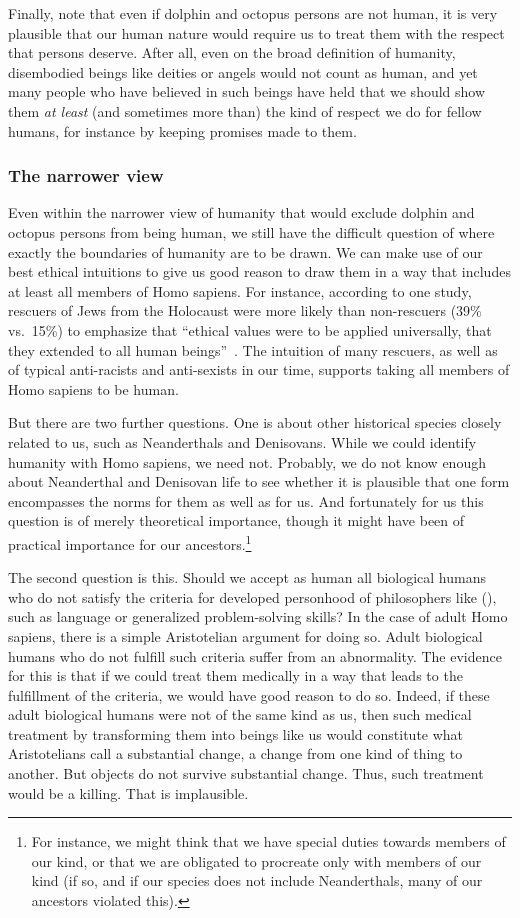 Finally, note that even if dolphin and octopus persons are not human, it is very plausible that our human nature would require us to treat them with the
respect that persons deserve. After all, even on the broad definition of humanity, disembodied beings like deities or angels would not count as human, and yet
many people who have believed in such beings have held that we should show them \textit{at least} (and sometimes more than) the 
kind of respect we do for fellow humans, for instance by keeping promises made to them.

\subsubsection{The narrower view}
Even within the narrower view of humanity that would exclude dolphin and octopus persons from being human, we still have the difficult question of where exactly the boundaries of humanity are to be drawn. 
We can make use of our best ethical intuitions to give us good reason to draw them in a way that includes at least all 
members of Homo sapiens. For instance, according to one study, rescuers of Jews from the Holocaust were more likely than non-rescuers (39\% vs.\ 15\%)
to emphasize that ``ethical values were to be applied universally, that they extended to all human beings''~\parencite[p.~165]{Oliner1988}. The intuition of many rescuers, as well as of typical anti-racists and 
anti-sexists in our time, supports taking all members of Homo sapiens to be human. 

But there are two further questions. One is about other historical species closely related to us, such as Neanderthals and Denisovans. While we could
identify humanity with Homo sapiens, we need not. Probably, we do not know enough about Neanderthal and Denisovan life to see whether it is 
plausible that one form encompasses the norms for them as well as for us. And fortunately for us this question is of merely theoretical importance, 
though it might have been of practical importance for our ancestors.\footnote{For instance, we might think that we have
special duties towards members of our kind, or that we are obligated to procreate only with members of our kind (if so, and if 
our species does not include Neanderthals, many of our ancestors violated this).}

The second question is this. Should we accept as human all biological humans who do not satisfy the 
criteria for developed personhood of philosophers like \citeauthor{WarrenAbortion} (\citeyear{WarrenAbortion}), such as language or generalized problem-solving skills? 
In the case of adult Homo sapiens, there is a simple Aristotelian argument for doing so. Adult biological humans who do not fulfill such criteria 
suffer from an abnormality. The evidence for this is that if we could treat them medically in a way that leads to the 
fulfillment of the criteria, we would have good reason to do so. Indeed, if these
adult biological humans were not of the same kind as us, then such medical treatment by transforming them into beings like us would constitute what Aristotelians
call a substantial change, a change from one kind of thing to another. But objects do not survive substantial change. Thus, such treatment would be a killing.
That is implausible.

